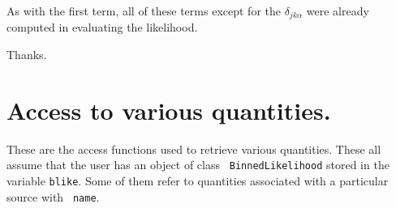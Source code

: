 \documentclass[preprint]{aastex}
\begin{document}
As with the first term, all of these terms except for the
$\delta_{jk\alpha}$ were already computed in evaluating the
likelihood.

\begin{acknowledgements}
  Thanks.
\end{acknowledgements}

%

\appendix

\section{Access to various quantities.}\label{app:access}

These are the access functions used to retrieve various quantities.
These all assume that the user has an object of class {\tt
  BinnedLikelihood} stored in the variable {\tt blike}.  Some of them
refer to quantities associated with a particular source with {\tt
  name}.
\end{document}
